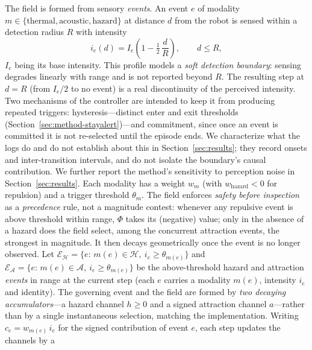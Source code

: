 The field is formed from sensory \emph{events}. An event $e$ of modality
$m\in\{\text{thermal},\text{acoustic},\text{hazard}\}$ at distance $d$ from the
robot is sensed within a detection radius $R$ with intensity
\begin{equation}
\label{eq:intensity}
i_e(d) = I_e\left(1 - \tfrac{1}{2}\,\frac{d}{R}\right), \qquad d \le R,
\end{equation}
$I_e$ being its base intensity. This profile models a \emph{soft detection
boundary}: sensing degrades linearly with range and is not reported beyond $R$.
The resulting step at $d=R$ (from $I_e/2$ to no event) is a real discontinuity of
the perceived intensity. Two mechanisms of the controller are intended to keep it
from producing repeated triggers: hysteresis---distinct enter and exit thresholds
(Section~\ref{sec:method-stayalert})---and commitment, since once an event is
committed it is not re-selected until the episode ends. We characterize what the
logs do and do not establish about this in Section~\ref{sec:results}; they record
onsets and inter-transition intervals, and do not isolate the boundary's causal
contribution. We further
report the method's sensitivity to perception noise in
Section~\ref{sec:results}. Each modality has a weight $w_m$ (with
$w_{\text{hazard}}<0$ for repulsion) and a trigger threshold $\theta_m$. The
field enforces \emph{safety before inspection} as a \emph{precedence} rule, not a
magnitude contest: whenever any repulsive event is above threshold within range,
$\Phi$ takes its (negative) value; only in the absence of a hazard does the field
select, among the concurrent attraction events, the strongest in magnitude. It
then decays geometrically once the event is no longer observed.
Let $\mathcal{E}_{\mathcal{H}}=\{e:\,m(e)\in\mathcal{H},\ i_e\ge\theta_{m(e)}\}$ and
$\mathcal{E}_{\mathcal{A}}=\{e:\,m(e)\in\mathcal{A},\ i_e\ge\theta_{m(e)}\}$ be the
above-threshold hazard and attraction \emph{events} in range at the current step
(each $e$ carries a modality $m(e)$, intensity $i_e$ and identity). The governing
event and the field are formed by \emph{two decaying accumulators}---a hazard
channel $h\ge 0$ and a signed attraction channel $a$---rather than by a single
instantaneous selection, matching the implementation. Writing $c_e=w_{m(e)}\,i_e$
for the signed contribution of event $e$, each step updates the channels by a
